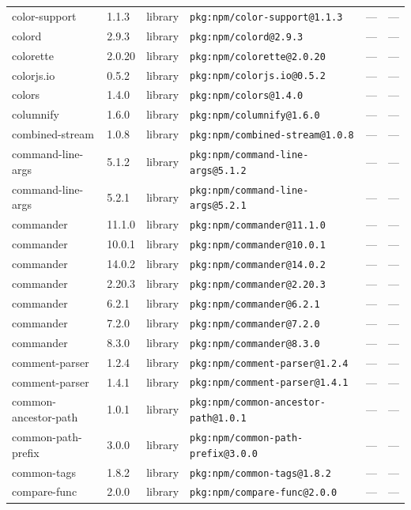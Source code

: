 \documentclass[11pt]{article}
\begin{document}
\begin{longtable}{|l|l|l|p{2.2cm}|l|p{4cm}|}
color-support & 1.1.3 & library & \texttt{pkg:npm/color-support@1.1.3} & — & — \\
colord & 2.9.3 & library & \texttt{pkg:npm/colord@2.9.3} & — & — \\
colorette & 2.0.20 & library & \texttt{pkg:npm/colorette@2.0.20} & — & — \\
colorjs.io & 0.5.2 & library & \texttt{pkg:npm/colorjs.io@0.5.2} & — & — \\
colors & 1.4.0 & library & \texttt{pkg:npm/colors@1.4.0} & — & — \\
columnify & 1.6.0 & library & \texttt{pkg:npm/columnify@1.6.0} & — & — \\
combined-stream & 1.0.8 & library & \texttt{pkg:npm/combined-stream@1.0.8} & — & — \\
command-line-args & 5.1.2 & library & \texttt{pkg:npm/command-line-args@5.1.2} & — & — \\
command-line-args & 5.2.1 & library & \texttt{pkg:npm/command-line-args@5.2.1} & — & — \\
commander & 11.1.0 & library & \texttt{pkg:npm/commander@11.1.0} & — & — \\
commander & 10.0.1 & library & \texttt{pkg:npm/commander@10.0.1} & — & — \\
commander & 14.0.2 & library & \texttt{pkg:npm/commander@14.0.2} & — & — \\
commander & 2.20.3 & library & \texttt{pkg:npm/commander@2.20.3} & — & — \\
commander & 6.2.1 & library & \texttt{pkg:npm/commander@6.2.1} & — & — \\
commander & 7.2.0 & library & \texttt{pkg:npm/commander@7.2.0} & — & — \\
commander & 8.3.0 & library & \texttt{pkg:npm/commander@8.3.0} & — & — \\
comment-parser & 1.2.4 & library & \texttt{pkg:npm/comment-parser@1.2.4} & — & — \\
comment-parser & 1.4.1 & library & \texttt{pkg:npm/comment-parser@1.4.1} & — & — \\
common-ancestor-path & 1.0.1 & library & \texttt{pkg:npm/common-ancestor-path@1.0.1} & — & — \\
common-path-prefix & 3.0.0 & library & \texttt{pkg:npm/common-path-prefix@3.0.0} & — & — \\
common-tags & 1.8.2 & library & \texttt{pkg:npm/common-tags@1.8.2} & — & — \\
compare-func & 2.0.0 & library & \texttt{pkg:npm/compare-func@2.0.0} & — & — \\

\end{longtable}
\end{document}
